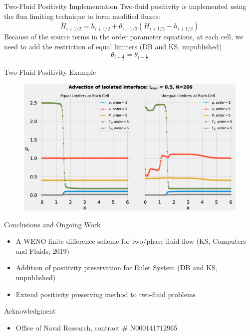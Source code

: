 \documentclass[10pt]{beamer}
\begin{document}
\begin{frame}{Two-Fluid Positivity Implementation}
Two-fluid positivity is implemented using the flux limiting technique to form modified fluxes:
$$\tilde{H}_{i+1/2}=h_{i+1/2} + \theta_{i+1/2}(H_{i+1/2} - h_{i+1/2})$$
Because of the source terms in the order parameter equations, at each cell, we need to add the restriction of equal limiters (DB and KS, unpublished)
$$
\theta_{i+\frac{1}{2}} = \theta_{i-\frac{1}{2}} 
$$

\end{frame}

\begin{frame}{Two Fluid Positivity Example}
  \begin{figure}[H]
    \centering
    \includegraphics[scale=0.275]{TwoFluidComparison.eps}
    \end{figure}
\end{frame}


\begin{frame}{Conclusions and Ongoing Work}
\begin{itemize}
  \item A WENO finite difference scheme for two/phase fluid flow (KS, Computers and Fluids, 2019)
  \item Addition of positivity preservation for Euler System (DB and KS, unpublished)
  \item Extend positivity preserving method to two-fluid problems 
\end{itemize}
\end{frame}

\begin{frame}{Acknowledgment}
  \begin{itemize}
  \item
    Office of Naval Research, contract $\#$ N000141712965
  \end{itemize}  
  
\end{frame}  
\end{document}
